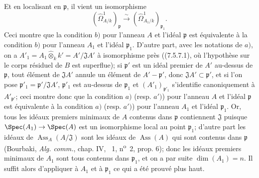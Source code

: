 Et en localisant en $\mathfrak p$, il vient un isomorphisme
\[
  (\hat{\Omega}^1_{A/k})_{\mathfrak p}\xrightarrow{\sim}(\hat{\Omega}^1_{A_1/k})_{\mathfrak p_1}.
\]
Ceci montre que la condition $b)$ pour l'anneau $A$ et l'idéal $\mathfrak p$ est équivalente à la condition $b)$ pour l'anneau $A_1$ et l'idéal $\mathfrak p_1$. D'autre part, avec les notations de $a)$, on a $A'_1=A_1\widehat{\otimes}_k k'=A'/\mathfrak JA'$ à isomorphisme près ((7.5.7.1), où l'hypothèse sur le corps résiduel de $B$ est superflue); si $\mathfrak p'$ est un idéal premier de $A'$ au-dessus de $\mathfrak p$, tout élément de $\mathfrak JA'$ annule un élément de $A'-\mathfrak p'$, donc $\mathfrak JA'\subset\mathfrak p'$, et si l'on pose $\mathfrak p'_1=\mathfrak p'/\mathfrak JA'$, $\mathfrak p'_1$ est au-dessus de $\mathfrak p_1$ et $(A'_1)_{\mathfrak p'_1}$ s'identifie canoniquement à $A'_{\mathfrak p'}$; ceci montre donc que la condition $a)$ (resp. $a')$) pour l'anneau $A$ et l'idéal $\mathfrak p$ est équivalente à la condition $a)$ (resp. $a')$) pour l'anneau $A_1$ et l'idéal $\mathfrak p_1$. Or, tous les idéaux premiers minimaux de $A$ contenus dans $\mathfrak p$ contiennent $\mathfrak J$ puisque $\Spec(A_1)\to\Spec(A)$ est un isomorphisme local au point $\mathfrak p_1$; d'autre part les idéaux de $\operatorname{Ass}_A(A/\mathfrak J)$ sont les idéaux de $\operatorname{Ass}(A)$ qui sont contenus dans $\mathfrak p$ (Bourbaki, \emph{Alg. comm.}, chap. IV, \textsection~1, n\textsuperscript{o}~2, prop. 6); donc les idéaux premiers minimaux de $A_1$ sont tous contenus dans $\mathfrak p_1$, et on a par suite $\dim(A_1)=n$. Il suffit alors d'appliquer à $A_1$ et à $\mathfrak p_1$ ce qui a été prouvé plus haut.

